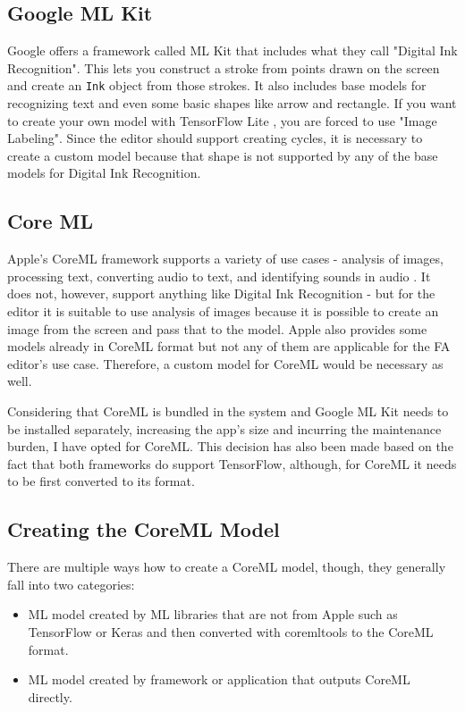 \subsection{Google ML Kit}

Google offers a framework called ML Kit that includes what they call "Digital Ink Recognition". This lets you construct a stroke from points drawn on the screen and create an \lstinline{Ink} object from those strokes. It also includes base models for recognizing text and even some basic shapes like arrow and rectangle. If you want to create your own model with TensorFlow Lite \cite{tensorflow}, you are forced to use "Image Labeling". Since the editor should support creating cycles, it is necessary to create a custom model because that shape is not supported by any of the base models for Digital Ink Recognition.

\subsection{Core ML}

Apple's CoreML framework supports a variety of use cases - analysis of images, processing text, converting audio to text, and identifying sounds in audio \cite{coreml}. It does not, however, support anything like Digital Ink Recognition - but for the editor it is suitable to use analysis of images because it is possible to create an image from the screen and pass that to the model. Apple also provides some models already in CoreML format \cite{coreml-models} but not any of them are applicable for the FA editor's use case. Therefore, a custom model for CoreML would be necessary as well.

Considering that CoreML is bundled in the system and Google ML Kit needs to be installed separately, increasing the app's size and incurring the maintenance burden, I have opted for CoreML. This decision has also been made based on the fact that both frameworks do support TensorFlow, although, for CoreML it needs to be first converted to its format.

\subsection{Creating the CoreML Model}

There are multiple ways how to create a CoreML model, though, they generally fall into two categories:
\begin{itemize}
    \item ML model created by ML libraries that are not from Apple such as TensorFlow or Keras \cite{keras} and then converted with coremltools \cite{coremltools} to the CoreML format.
    \item ML model created by framework or application that outputs CoreML directly.
\end{itemize}

